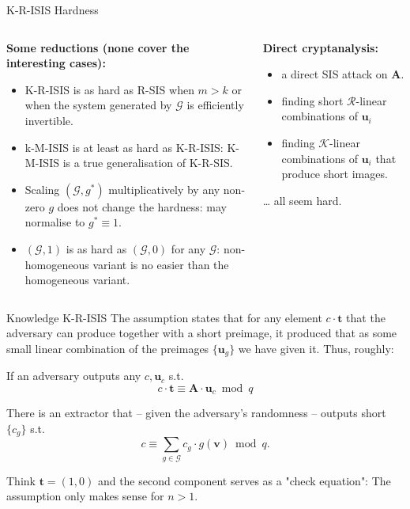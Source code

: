 \documentclass[xcolor=table,10pt,aspectratio=169]{beamer}
\renewcommand{\vec}[1]{\ensuremath{\mathbf{#1}}\xspace}
\providecommand{\mat}[1]{\ensuremath{\vec{#1}}\xspace}
\providecommand{\ring}[0]{\ensuremath{\mathcal{R}}\xspace}
\begin{document}
\begin{frame}[label={sec:org0bc52f6}]{K-R-ISIS Hardness}
\begin{columns}
\begin{column}[t]{0.65\columnwidth}
\textbf{Some reductions (none cover the interesting cases):}
\begin{itemize}
\item K-R-ISIS is as hard as R-SIS when \(m > k\) or when the system generated by \(\mathcal{G}\) is efficiently invertible.
\item k-M-ISIS is at least as hard as K-R-ISIS: K-M-ISIS is a true generalisation of K-R-SIS.
\item Scaling \((\mathcal{G},g^*)\) multiplicatively by any non-zero \(g\) does not change the hardness: may normalise to \(g^{*} \equiv 1\).
\item \((\mathcal{G},1)\) is as hard as \((\mathcal{G},0)\) for any \(\mathcal{G}\): non-homogeneous variant is no easier than the homogeneous variant.
\end{itemize}
\end{column}

\begin{column}[t]{0.35\columnwidth}
\textbf{Direct cryptanalysis:}
\begin{itemize}
\item a direct SIS attack on \(\mat{A}\).
\item finding short \(\ring\)-linear combinations of \(\vec{u}_{i}\)
\item finding \(\mathcal{K}\)-linear combinations of \(\vec{u}_{i}\) that produce short images.
\end{itemize}

… all seem hard.
\end{column}
\end{columns}
\end{frame}

\begin{frame}[label={sec:org6de6598}]{Knowledge K-R-ISIS}
The assumption states that for any element \(c \cdot \vec{t}\) that the adversary can produce together with a short preimage, it produced that as some small linear combination of the preimages \(\{\vec{u}_{g}\}\) we have given it. Thus, roughly:

\begin{definition}
If an adversary outputs any \(c, \vec{u}_{c}\) s.t.
\[
c \cdot \vec{t} \equiv \mat{A} \cdot \vec{u}_{c} \bmod q
\]

There is an extractor that -- given the adversary's randomness -- outputs short
\(\{c_{g}\}\) s.t.
\[
c \equiv \sum_{g \in \mathcal{G}} c_{g} \cdot g(\vec{v}) \bmod q.
\]
\end{definition}

Think \(\vec{t} = (1,0)\) and the second component serves as a "check equation": The assumption only makes sense for \(n>1\).
\end{frame}
\end{document}
